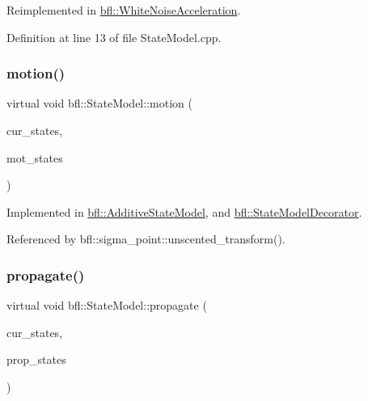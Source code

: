 Reimplemented in \mbox{\hyperlink{classbfl_1_1WhiteNoiseAcceleration_a10d81273e59d14f7d7ce794533c122a8}{bfl\+::\+White\+Noise\+Acceleration}}.



Definition at line 13 of file State\+Model.\+cpp.

\mbox{\label{classbfl_1_1StateModel_a34037bc30bc07667b76b5a719a65ab82}} 
\subsubsection{\texorpdfstring{motion()}{motion()}}
{\footnotesize\ttfamily virtual void bfl\+::\+State\+Model\+::motion (\begin{DoxyParamCaption}\item[{const Eigen\+::\+Ref$<$ const Eigen\+::\+Matrix\+Xd $>$ \&}]{cur\+\_\+states,  }\item[{Eigen\+::\+Ref$<$ Eigen\+::\+Matrix\+Xd $>$}]{mot\+\_\+states }\end{DoxyParamCaption})\hspace{0.3cm}{\ttfamily [pure virtual]}}



Implemented in \mbox{\hyperlink{classbfl_1_1AdditiveStateModel_a9f145bf8c592fc0092d84421f26dbb8b}{bfl\+::\+Additive\+State\+Model}}, and \mbox{\hyperlink{classbfl_1_1StateModelDecorator_af0ffeccf4bfcf8ddb36f3e6704fae7d2}{bfl\+::\+State\+Model\+Decorator}}.



Referenced by bfl\+::sigma\+\_\+point\+::unscented\+\_\+transform().

\mbox{\label{classbfl_1_1StateModel_a39cd8c8c5adbd623884583b4a7a7415c}} 
\subsubsection{\texorpdfstring{propagate()}{propagate()}}
{\footnotesize\ttfamily virtual void bfl\+::\+State\+Model\+::propagate (\begin{DoxyParamCaption}\item[{const Eigen\+::\+Ref$<$ const Eigen\+::\+Matrix\+Xd $>$ \&}]{cur\+\_\+states,  }\item[{Eigen\+::\+Ref$<$ Eigen\+::\+Matrix\+Xd $>$}]{prop\+\_\+states }\end{DoxyParamCaption})\hspace{0.3cm}{\ttfamily [pure virtual]}}




